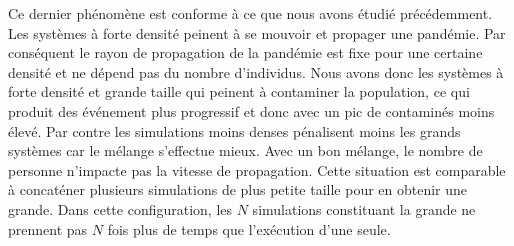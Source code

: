 Ce dernier phénomène est conforme à ce que nous avons étudié précédemment. Les systèmes à forte densité peinent à se mouvoir et propager une pandémie. Par conséquent le rayon de propagation de la pandémie est fixe pour une certaine densité et ne dépend pas du nombre d'individus. Nous avons donc les systèmes à forte densité et grande taille qui peinent à contaminer la population, ce qui produit des événement plus progressif et donc avec un pic de contaminés moins élevé. Par contre les simulations moins denses pénalisent moins les grands systèmes car le mélange s'effectue mieux. Avec un bon mélange, le nombre de personne n'impacte pas la vitesse de propagation. Cette situation est comparable à concaténer plusieurs simulations de plus petite taille pour en obtenir une grande. Dans cette configuration, les $N$ simulations constituant la grande ne prennent pas $N$ fois plus de temps que l'exécution d'une seule.
